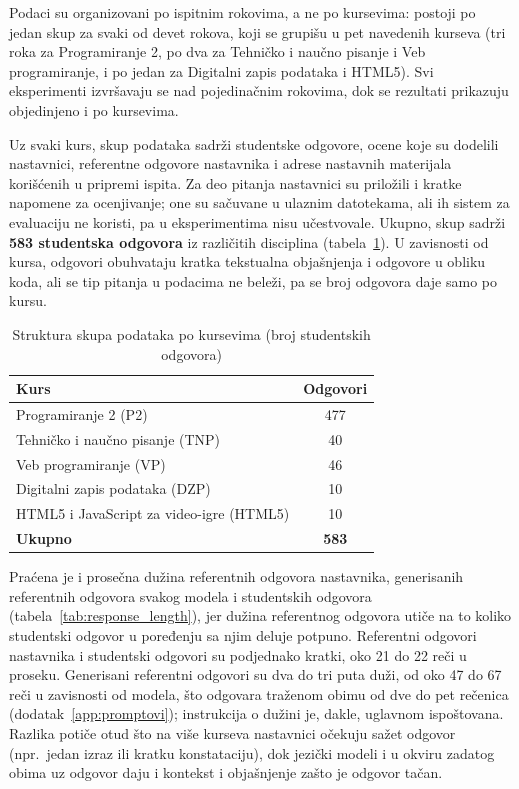 Podaci su organizovani po ispitnim rokovima, a ne po kursevima: postoji po jedan skup za svaki od devet rokova,
koji se grupišu u pet navedenih kurseva (tri roka za Programiranje 2,
po dva za Tehničko i naučno pisanje i Veb programiranje, i po jedan za Digitalni zapis podataka i HTML5).
Svi eksperimenti izvršavaju se nad pojedinačnim rokovima, dok se rezultati prikazuju objedinjeno i po kursevima.

Uz svaki kurs, skup podataka sadrži studentske odgovore, ocene koje su dodelili nastavnici,
referentne odgovore nastavnika i adrese nastavnih materijala korišćenih u pripremi ispita.
Za deo pitanja nastavnici su priložili i kratke napomene za ocenjivanje;
one su sačuvane u ulaznim datotekama, ali ih sistem za evaluaciju ne koristi, pa u eksperimentima nisu učestvovale.
Ukupno, skup sadrži \textbf{583 studentska odgovora} iz različitih disciplina (tabela~\ref{tab:dataset}).
U zavisnosti od kursa, odgovori obuhvataju kratka tekstualna objašnjenja i odgovore u obliku koda,
ali se tip pitanja u podacima ne beleži, pa se broj odgovora daje samo po kursu.

\begin{table}[ht]
\centering
\caption{Struktura skupa podataka po kursevima (broj studentskih odgovora)}
\label{tab:dataset}
\begin{tabular}{lc}
\toprule
\textbf{Kurs} & \textbf{Odgovori} \\
\midrule
Programiranje 2 (P2) & 477 \\
Tehničko i naučno pisanje (TNP) & 40 \\
Veb programiranje (VP) & 46 \\
Digitalni zapis podataka (DZP) & 10 \\
HTML5 i JavaScript za video-igre (HTML5) & 10 \\
\midrule
\textbf{Ukupno} & \textbf{583} \\
\bottomrule
\end{tabular}
\end{table}

Praćena je i prosečna dužina referentnih odgovora nastavnika,
generisanih referentnih odgovora svakog modela i studentskih odgovora (tabela~\ref{tab:response_length}),
jer dužina referentnog odgovora utiče na to koliko studentski odgovor u poređenju sa njim deluje potpuno.
Referentni odgovori nastavnika i studentski odgovori su podjednako kratki, oko 21 do 22 reči u proseku.
Generisani referentni odgovori su dva do tri puta duži, od oko 47 do 67 reči u zavisnosti od modela,
što odgovara traženom obimu od dve do pet rečenica (dodatak~\ref{app:promptovi}); instrukcija o dužini je, dakle, uglavnom ispoštovana.
Razlika potiče otud što na više kurseva nastavnici očekuju sažet odgovor (npr.\ jedan izraz ili kratku konstataciju),
dok jezički modeli i u okviru zadatog obima uz odgovor daju i kontekst i objašnjenje zašto je odgovor tačan.

